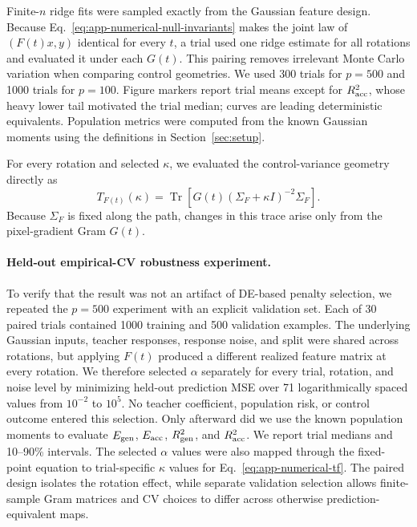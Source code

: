 Finite-$n$ ridge fits were sampled exactly from the Gaussian feature design.
Because Eq.~\ref{eq:app-numerical-null-invariants} makes the joint law of
$(F(t)x,y)$ identical for every $t$, a trial used one ridge estimate for all
rotations and evaluated it under each $G(t)$.  This pairing removes irrelevant
Monte Carlo variation when comparing control geometries.  We used 300 trials
for $p=500$ and 1000 trials for $p=100$.  Figure markers report trial means
except for $R^2_{\rm acc}$, whose heavy lower tail motivated the trial median;
curves are leading deterministic equivalents.  Population metrics were
computed from the known Gaussian moments using the definitions in
Section~\ref{sec:setup}.

For every rotation and selected $\kappa$, we evaluated the control-variance
geometry directly as
\begin{equation}
 T_{F(t)}(\kappa)=\operatorname{Tr}\!\left[
 G(t)(\Sigma_F+\kappa I)^{-2}\Sigma_F\right].
 \label{eq:app-numerical-tf}
\end{equation}
Because $\Sigma_F$ is fixed along the path, changes in this trace arise only
from the pixel-gradient Gram $G(t)$.

\paragraph{Held-out empirical-CV robustness experiment.}
To verify that the result was not an artifact of DE-based penalty selection,
we repeated the $p=500$ experiment with an explicit validation set.  Each of
30 paired trials contained 1000 training and 500 validation examples.  The
underlying Gaussian inputs, teacher responses, response noise, and split were
shared across rotations, but applying $F(t)$ produced a different realized
feature matrix at every rotation.  We therefore selected $\alpha$ separately
for every trial, rotation, and noise level by minimizing held-out prediction
MSE over 71 logarithmically spaced values from $10^{-2}$ to $10^5$.  No
teacher coefficient, population risk, or control outcome entered this
selection.  Only afterward did we use the known population moments to evaluate
$E_{\rm gen}$, $E_{\rm acc}$, $R^2_{\rm gen}$, and $R^2_{\rm acc}$.  We report
trial medians and 10--90\% intervals.  The selected $\alpha$ values were also
mapped through the fixed-point equation to trial-specific $\kappa$ values for
Eq.~\ref{eq:app-numerical-tf}.  The paired design isolates the rotation effect,
while separate validation selection allows finite-sample Gram matrices and CV
choices to differ across otherwise prediction-equivalent maps.

